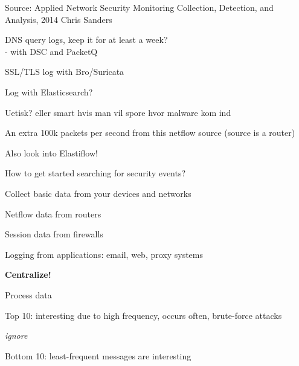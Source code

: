 \documentclass[Screen16to9,17pt]{foils}
\begin{document}
Source: Applied Network Security Monitoring Collection, Detection, and Analysis, 2014 Chris Sanders




\begin{list2}
\item DNS query logs, keep it for at least a week?\\
- with DSC and PacketQ 
\item SSL/TLS log with Bro/Suricata\\
{\footnotesize{}}
\item Log with Elasticsearch?\\
{\footnotesize{}}
\end{list2}

\centerline{Uetisk? eller smart hvis man vil spore hvor malware kom ind}



\centerline{An extra 100k packets per second from this netflow source (source is a router)}

Also look into Elastiflow! 


\begin{list1}
\item How to get started searching for security events?
\item Collect basic data from your devices and networks
\begin{list2}
\item Netflow data from routers
\item Session data from firewalls
\item Logging from applications: email, web, proxy systems
\end{list2}
\item {\bf Centralize!}
\item Process data
\begin{list2}
\item Top 10: interesting due to high frequency, occurs often, brute-force attacks
\item {\it ignore}
\item Bottom 10: least-frequent messages are interesting
\end{list2}
\end{list1}
\end{document}
